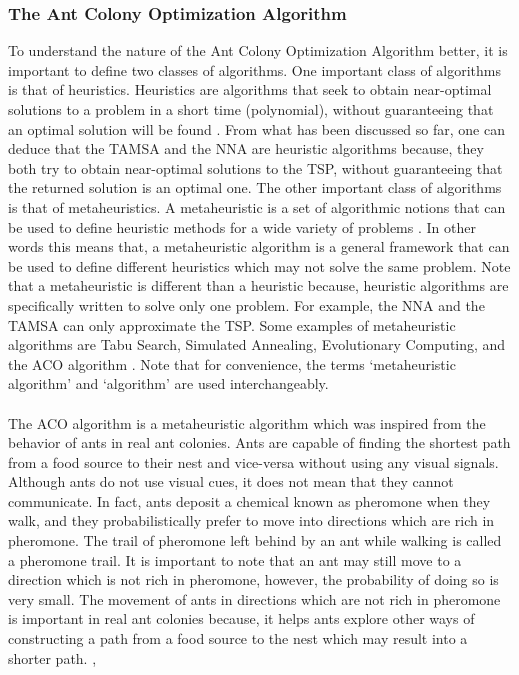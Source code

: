 \documentclass[12pt]{article}
\numberwithin{equation}{subsection}
\numberwithin{table}{subsection}
\begin{document}
\subsubsection{The Ant Colony Optimization Algorithm}
\label{section_ACO}
To understand the nature of the Ant Colony Optimization Algorithm better, it is important to define two classes of algorithms. One important class of algorithms is that of heuristics. Heuristics are algorithms that seek to obtain near-optimal solutions to a problem in a short time (polynomial), without guaranteeing that an optimal solution will be found \cite{dorigo_stutzle_thomas_2004}. From what has been discussed so far, one can deduce that the TAMSA and the NNA are heuristic algorithms because, they both try to obtain near-optimal solutions to the TSP, without guaranteeing that the returned solution is an optimal one. The other important class of algorithms is that of metaheuristics.  A metaheuristic is a set of algorithmic notions that can be used to define heuristic methods for a wide variety of problems \cite{dorigo_stutzle_thomas_2004}. In other words this means that, a metaheuristic algorithm is a general framework that can be used to define different heuristics which may not solve the same problem. Note that a metaheuristic is different than a heuristic because, heuristic algorithms are specifically written to solve only one problem. For example, the NNA and the TAMSA can only approximate the TSP. Some examples of metaheuristic algorithms are Tabu Search, Simulated Annealing, Evolutionary Computing, and the ACO algorithm \cite{dorigo_stutzle_thomas_2004}. Note that for convenience, the terms `metaheuristic algorithm' and `algorithm' are used interchangeably.\\\\
The ACO algorithm is a metaheuristic algorithm which was inspired from the behavior of ants in real ant colonies. Ants are capable of finding the shortest path from a food source to their nest and vice-versa without using any visual signals. Although ants do not use visual cues, it does not mean that they cannot communicate. In fact, ants deposit a chemical known as pheromone when they walk, and they probabilistically prefer to move into directions which are rich in pheromone. The trail of pheromone left behind by an ant while walking is called a pheromone trail. It is important to note that an ant may still move to a direction which is not rich in pheromone, however, the probability of doing so is very small. The movement of ants in directions which are not rich in pheromone is important in real ant colonies because, it helps ants explore other ways of constructing a path from a food source to the nest which may result into a shorter path. \cite{dorigo_gambardella_1997}, \cite{dorigo_stutzle_thomas_2004}\\\\ 
\end{document}
